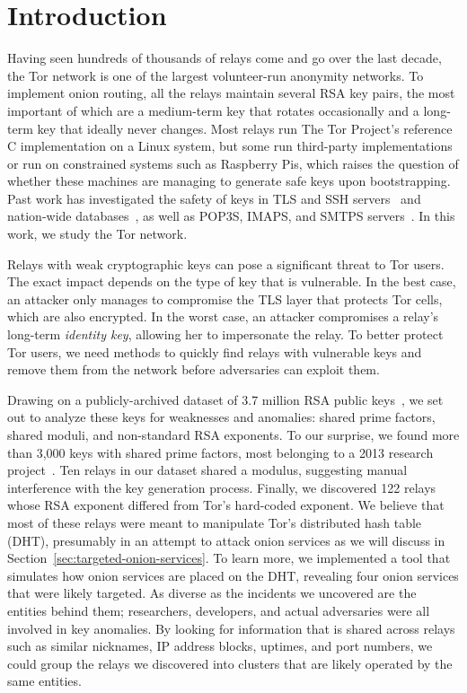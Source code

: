 \section{Introduction}
Having seen hundreds of thousands of relays come and go over the last decade,
the Tor network is one of the largest volunteer-run anonymity networks.  To
implement onion routing, all the relays maintain several RSA key pairs, 
the most important of which are a medium-term key that rotates occasionally 
and a long-term key that ideally never changes.  
Most relays run The Tor Project's reference C
implementation on a Linux system, but some run third-party implementations or 
run on constrained systems such as Raspberry Pis, which 
raises the question of whether these machines are managing to generate 
safe keys upon bootstrapping.  Past work has investigated the safety of
keys in TLS and SSH servers~\cite{Heninger2012a} and  
nation-wide databases~\cite{Bernstein2013a}, as well as POP3S, IMAPS, and SMTPS
servers~\cite{Hastings2016a}.  In this work, we study the Tor network.

Relays with weak cryptographic keys can pose a significant threat to Tor users.
The exact impact depends on the type of key that is vulnerable.  In the best
case, an attacker only manages to compromise the TLS layer that protects Tor
cells, which are also encrypted.  In the worst case, an attacker compromises a
relay's long-term \emph{identity key}, allowing her to impersonate the relay.
To better protect Tor users, we need methods to quickly find relays with
vulnerable keys and remove them from the network before adversaries can exploit
them.

Drawing on a publicly-archived dataset of 3.7 million RSA public
keys~\cite{collector}, we set out to analyze these keys for weaknesses and
anomalies: shared prime factors, shared moduli, and non-standard RSA exponents.
To our surprise, we found more than 3,000 keys with shared prime factors, most
belonging to a 2013 research project~\cite{Biryukov2013a}.  Ten relays in
our dataset shared a modulus, suggesting manual interference with the key
generation process.  Finally, we discovered 122 relays whose RSA exponent
differed from Tor's hard-coded exponent.  We believe that most of these relays
were meant to manipulate Tor's distributed hash table (DHT), presumably in an
attempt to attack onion services as we will discuss in
Section~\ref{sec:targeted-onion-services}.  To learn more, we implemented a
tool that simulates how onion services are placed on the DHT, revealing four
onion services that were likely targeted.  As diverse as the incidents we
uncovered are the entities behind them; researchers, developers, and actual
adversaries were all involved in key anomalies.  By looking for information that
is shared across relays such as similar nicknames, IP address blocks, uptimes,
and port numbers, we could group the relays we discovered into clusters that are
likely operated by the same entities.

